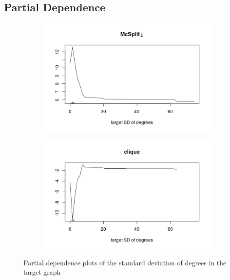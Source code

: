 \documentclass{l4proj}
\theoremstyle{definition}
\theoremstyle{remark}
\begin{document}
\subsection{Partial Dependence} \label{sec:unlabelled_partial}

\begin{figure}
  \centering
  \begin{subfigure}[t]{0.49\textwidth}
    \centering
    \includegraphics[width=\textwidth]{images/mcsplit_partial.png}
  \end{subfigure}
  \begin{subfigure}[t]{0.49\textwidth}
    \centering
    \includegraphics[width=\textwidth]{images/clique_partial.png}
  \end{subfigure}
  \caption{Partial dependence plots of the standard deviation of degrees in the
    target graph}
  \label{fig:unlabelled_partials}
\end{figure}
\end{document}
